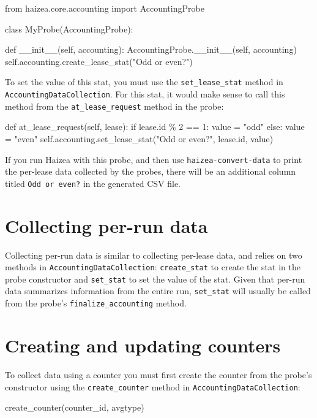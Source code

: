 \begin{wideshellverbatim}
from haizea.core.accounting import AccountingProbe

class MyProbe(AccountingProbe):
    
    def __init__(self, accounting):
        AccountingProbe.__init__(self, accounting)
        self.accounting.create_lease_stat("Odd or even?")	
\end{wideshellverbatim}

To set the value of this stat, you must use the \verb+set_lease_stat+ method in \texttt{AccountingDataCollection}. For this stat, it would make sense to call this method from the \texttt{at\_lease\_request} method in the probe:

\begin{wideshellverbatim}
def at_lease_request(self, lease):
    if lease.id \% 2 == 1:
        value = "odd"
    else:
        value = "even"
    self.accounting.set_lease_stat("Odd or even?", lease.id, value)	
\end{wideshellverbatim}

If you run Haizea with this probe, and then use \texttt{haizea-convert-data} to print the per-lease data collected by the probes, there will be an additional column titled \texttt{Odd or even?} in the generated CSV file.


\section{Collecting per-run data}

Collecting per-run data is similar to collecting per-lease data, and relies on two methods in \texttt{AccountingDataCollection}: \verb+create_stat+ to create the stat in the probe constructor and \verb+set_stat+ to set the value of the stat. Given that per-run data summarizes information from the entire run, \verb+set_stat+ will usually be called from the probe's \texttt{finalize\_accounting} method.


\section{Creating and updating counters}

To collect data using a counter you must first create the counter from the probe's constructor using the \verb+create_counter+ method in \texttt{AccountingDataCollection}:

\begin{wideshellverbatim}
create_counter(counter_id, avgtype)
\end{wideshellverbatim}

